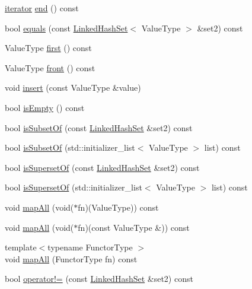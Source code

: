 \begin{DoxyCompactItemize}
\mbox{\hyperlink{classLinkedHashSet_1_1iterator}{iterator}} \mbox{\hyperlink{classLinkedHashSet_a68b688a51bd0cf6fb5bc2cba292209a8}{end}} () const
\item 
bool \mbox{\hyperlink{classLinkedHashSet_ad5f8d1799c79ff6767db59cdb230bdb1}{equals}} (const \mbox{\hyperlink{classLinkedHashSet}{Linked\+Hash\+Set}}$<$ Value\+Type $>$ \&set2) const
\item 
Value\+Type \mbox{\hyperlink{classLinkedHashSet_aaeecd3ae022dd6b19df936718f4ab831}{first}} () const
\item 
Value\+Type \mbox{\hyperlink{classLinkedHashSet_abaa174a9d74f7e7e38d4944fa43b5a33}{front}} () const
\item 
void \mbox{\hyperlink{classLinkedHashSet_ad2b89af3c836e14eecca0f9a4b4d6721}{insert}} (const Value\+Type \&value)
\item 
bool \mbox{\hyperlink{classLinkedHashSet_acf82f9b2937375c7b1cf3dccb3df3312}{is\+Empty}} () const
\item 
bool \mbox{\hyperlink{classLinkedHashSet_a56454dffd69458b8528eb778110acfee}{is\+Subset\+Of}} (const \mbox{\hyperlink{classLinkedHashSet}{Linked\+Hash\+Set}} \&set2) const
\item 
bool \mbox{\hyperlink{classLinkedHashSet_a4d0c68e90ea31896c3c74b8d8a066db2}{is\+Subset\+Of}} (std\+::initializer\+\_\+list$<$ Value\+Type $>$ list) const
\item 
bool \mbox{\hyperlink{classLinkedHashSet_a2436b013b75d17a71b3425c4ef7679f5}{is\+Superset\+Of}} (const \mbox{\hyperlink{classLinkedHashSet}{Linked\+Hash\+Set}} \&set2) const
\item 
bool \mbox{\hyperlink{classLinkedHashSet_ad715481e7f266fb44aa3fa9f447cd4fe}{is\+Superset\+Of}} (std\+::initializer\+\_\+list$<$ Value\+Type $>$ list) const
\item 
void \mbox{\hyperlink{classLinkedHashSet_a2931bda025b4800f128f37790d21f49f}{map\+All}} (void($\ast$fn)(Value\+Type)) const
\item 
void \mbox{\hyperlink{classLinkedHashSet_a395b81e6a77aa9702362198771785dfd}{map\+All}} (void($\ast$fn)(const Value\+Type \&)) const
\item 
{\footnotesize template$<$typename Functor\+Type $>$ }\\void \mbox{\hyperlink{classLinkedHashSet_a8dc32c1e45704cfae41daf8adb4e66dc}{map\+All}} (Functor\+Type fn) const
\item 
bool \mbox{\hyperlink{classLinkedHashSet_ac97d356f932049eb4e476410456f1f55}{operator!=}} (const \mbox{\hyperlink{classLinkedHashSet}{Linked\+Hash\+Set}} \&set2) const

\end{DoxyCompactItemize}

